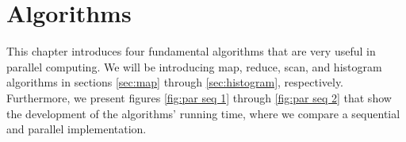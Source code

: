 \chapter{Algorithms}
\label{chap:algorithms}

This chapter introduces four fundamental algorithms that are very useful in parallel computing.
We will be introducing map, reduce, scan, and histogram algorithms in sections \ref{sec:map} through \ref{sec:histogram}, respectively.
Furthermore, we present figures \ref{fig:par seq 1} through \ref{fig:par seq 2} that show the development of the algorithms' running time, where we compare a sequential and parallel implementation.

%      
%      

%      
%      






